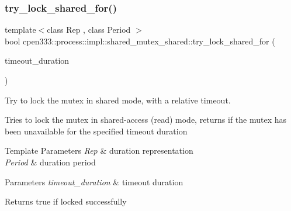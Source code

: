 \subsubsection{\texorpdfstring{try\+\_\+lock\+\_\+shared\+\_\+for()}{try\_lock\_shared\_for()}}
{\footnotesize\ttfamily template$<$class Rep , class Period $>$ \\
bool cpen333\+::process\+::impl\+::shared\+\_\+mutex\+\_\+shared\+::try\+\_\+lock\+\_\+shared\+\_\+for (\begin{DoxyParamCaption}\item[{const std\+::chrono\+::duration$<$ Rep, Period $>$ \&}]{timeout\+\_\+duration }\end{DoxyParamCaption})\hspace{0.3cm}{\ttfamily [inline]}}



Try to lock the mutex in shared mode, with a relative timeout. 

Tries to lock the mutex in shared-\/access (read) mode, returns if the mutex has been unavailable for the specified timeout duration


\begin{DoxyTemplParams}{Template Parameters}
{\em Rep} & duration representation \\
\hline
{\em Period} & duration period \\
\hline
\end{DoxyTemplParams}

\begin{DoxyParams}{Parameters}
{\em timeout\+\_\+duration} & timeout duration \\
\hline
\end{DoxyParams}
\begin{DoxyReturn}{Returns}
true if locked successfully 
\end{DoxyReturn}
\mbox{\label{classcpen333_1_1process_1_1impl_1_1shared__mutex__shared_a25bf54e2064e78bc18e996dacb082f3c}} 
